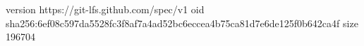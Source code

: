 version https://git-lfs.github.com/spec/v1
oid sha256:6ef08c597da5528fc3f8af7a4ad52bc6eccea4b75ca81d7e6de125f0b642ca4f
size 196704
